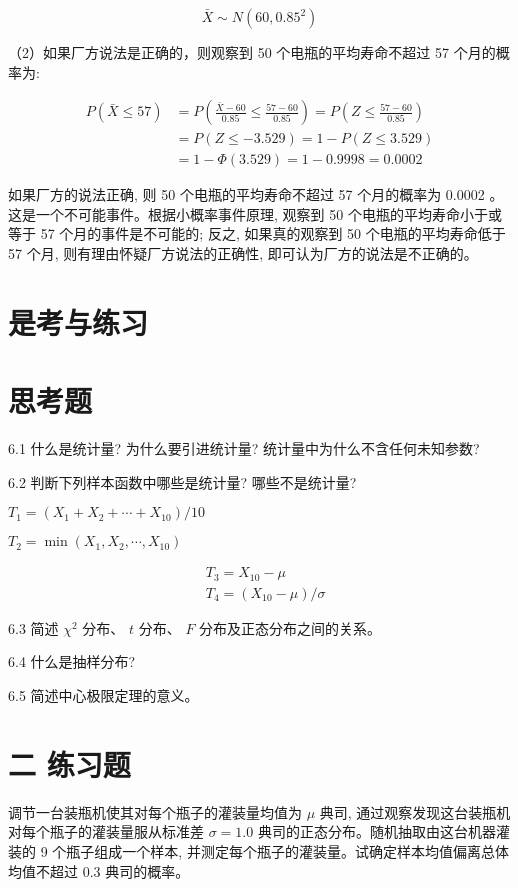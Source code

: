 \documentclass[10pt]{article}
\begin{document}
\begin{CJK*}{UTF8}{bsmi}
$$
\bar{X} \sim N\left(60,0.85^{2}\right)
$$

（2）如果厂方说法是正确的，则观察到 50 个电瓶的平均寿命不超过 57 个月的概率为:

$$
\begin{aligned}
P(\bar{X} \leqslant 57) & =P\left(\frac{\bar{X}-60}{0.85} \leqslant \frac{57-60}{0.85}\right)=P\left(Z \leqslant \frac{57-60}{0.85}\right) \\
& =P(Z \leqslant-3.529)=1-P(Z \leqslant 3.529) \\
& =1-\Phi(3.529)=1-0.9998=0.0002
\end{aligned}
$$

如果厂方的说法正确, 则 50 个电瓶的平均寿命不超过 57 个月的概率为 0.0002 。这是一个不可能事件。根据小概率事件原理, 观察到 50 个电瓶的平均寿命小于或等于 57 个月的事件是不可能的; 反之, 如果真的观察到 50 个电瓶的平均寿命低于 57 个月, 则有理由怀疑厂方说法的正确性, 即可认为厂方的说法是不正确的。

\section*{是考与练习}
\section*{思考题}
6.1 什么是统计量? 为什么要引进统计量? 统计量中为什么不含任何未知参数?

6.2 判断下列样本函数中哪些是统计量? 哪些不是统计量?

$T_{1}=\left(X_{1}+X_{2}+\cdots+X_{10}\right) / 10$

$T_{2}=\min \left(X_{1}, X_{2}, \cdots, X_{10}\right)$

$$
\begin{aligned}
& T_{3}=X_{10}-\mu \\
& T_{4}=\left(X_{10}-\mu\right) / \sigma
\end{aligned}
$$

6.3 简述 $\chi^{2}$ 分布、 $t$ 分布、 $F$ 分布及正态分布之间的关系。

6.4 什么是抽样分布?

6.5 简述中心极限定理的意义。

\section*{二 练习题}
调节一台装瓶机使其对每个瓶子的灌装量均值为 $\mu$ 典司, 通过观察发现这台装瓶机对每个瓶子的灌装量服从标准差 $\sigma=1.0$ 典司的正态分布。随机抽取由这台机器灌装的 9 个瓶子组成一个样本, 并测定每个瓶子的灌装量。试确定样本均值偏离总体均值不超过 0.3 典司的概率。


\end{CJK*}
\end{document}
